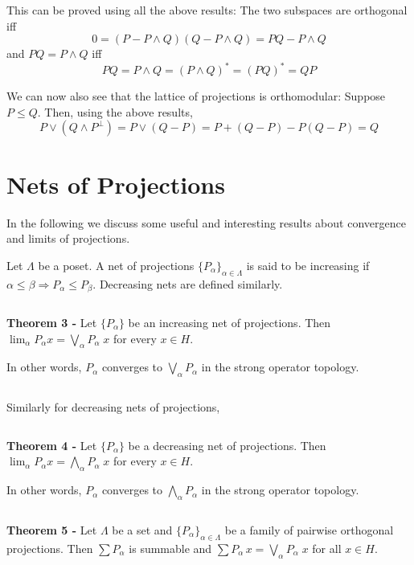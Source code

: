 \documentclass[12pt]{article}
\begin{document}
This can be proved using all the above results: The two subspaces are orthogonal iff
\begin{displaymath}
0 = (P - P \land Q)(Q - P \land Q) = PQ - P \land Q
\end{displaymath}
and $PQ = P \land Q$ iff 
\begin{displaymath}
PQ = P \land Q = (P \land Q)^* = (PQ)^*= QP
\end{displaymath}

We can now also see that the lattice of projections is orthomodular: Suppose $P \leq Q$. Then, using the above results,
\begin{displaymath}
P \lor (Q \land P^{\perp}) = P \lor (Q-P) = P + (Q-P) - P(Q-P) = Q
\end{displaymath}



\section{Nets of Projections}

In the following we discuss some useful and interesting results about convergence and limits of projections.

Let $\Lambda$ be a poset. A net of projections $\{P_{\alpha}\}_{\alpha \in \Lambda}$ is said to be increasing
if $\alpha \leq \beta \Longrightarrow P_{\alpha} \leq P_{\beta}$. Decreasing nets are
defined similarly.

$\,$

{\bf Theorem 3 -} Let $\{P_{\alpha}\}$ be an increasing net of projections. Then
 $\lim_{\alpha} P_{\alpha} x = \bigvee_{\alpha} P_{\alpha}\;x$ for every $x \in H$.

In other words, $P_{\alpha}$ converges to $\bigvee_{\alpha} P_{\alpha}$ in the strong operator
 topology.

$\,$

Similarly for decreasing nets of projections,

$\;$

{\bf Theorem 4 -} Let $\{P_{\alpha}\}$ be a decreasing net of projections. Then
 $\lim_{\alpha} P_{\alpha} x = \bigwedge_{\alpha} P_{\alpha}\;x$ for every $x \in H$.

In other words, $P_{\alpha}$ converges to $\bigwedge_{\alpha} P_{\alpha}$ in the strong operator
 topology.

$\,$

{\bf Theorem 5 -} Let $\Lambda$ be a set and $\{P_{\alpha}\}_{\alpha \in \Lambda}$ be a family of pairwise orthogonal projections. Then $\sum P_{\alpha}$ is summable and $\sum P_{\alpha}\,x = \bigvee_{\alpha} P_{\alpha}\;x$ for all $x \in H$.


\end{document}
